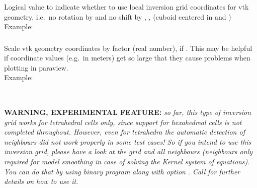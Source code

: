 \subsubsection{}
Logical value to indicate whether to use local inversion grid coordinates for vtk geometry, i.e.\ no rotation 
by  and no shift by , , 
 (cuboid centered in  and )\\
Example:\\
\subsubsection{}
Scale vtk geometry coordinates by factor  (real number), if 
. This may be helpful if coordinate values (e.g.\ in meters) 
get so large that they cause problems when plotting in paraview.\\
Example:\\
\\
%
\subsection{} \label{basic_steps,sec:invgrid,sub:ecart}
%
{\bf WARNING, EXPERIMENTAL FEATURE:} \emph{so far, this type of inversion grid works for tetrahedral cells only,
since support for hexahedreal cells is not completed throughout. However, even for tetrahedra the automatic detection 
of neighbours did not work properly in some test cases! So if you intend to use this inversion grid, please have a look 
at the grid and all neighbours (neighbours only required for model smoothing in case of solving the Kernel system of equations).
You can do that by using binary program}  \emph{along with option}  \emph{. Call} 
 \emph{for further details on how to use it.}

